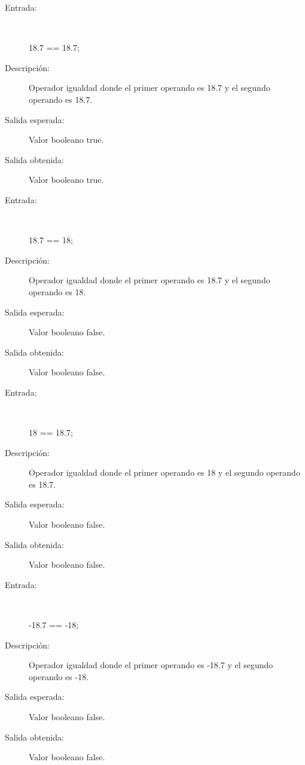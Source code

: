 	\begin{description}
		\item [Entrada:] \hfill \\
\begin{myverbatim}
 18.7 == 18.7;
\end{myverbatim}
		\item [Descripción:] Operador igualdad donde el primer operando es 18.7 y el segundo operando es  18.7.
		\item [Salida esperada:] Valor booleano true.
		\item [Salida obtenida:] Valor booleano true.
	\end{description}

	\begin{description}
		\item [Entrada:] \hfill \\
\begin{myverbatim}
 18.7 == 18;
\end{myverbatim}
		\item [Descripción:] Operador igualdad donde el primer operando es 18.7 y el segundo operando es  18.
		\item [Salida esperada:] Valor booleano false.
		\item [Salida obtenida:] Valor booleano false.
	\end{description}

	\begin{description}
		\item [Entrada:] \hfill \\
\begin{myverbatim}
 18 == 18.7;
\end{myverbatim}
		\item [Descripción:] Operador igualdad donde el primer operando es 18 y el segundo operando es  18.7.
		\item [Salida esperada:] Valor booleano false.
		\item [Salida obtenida:] Valor booleano false.
	\end{description}

	\begin{description}
		\item [Entrada:] \hfill \\
\begin{myverbatim}
 -18.7 == -18;
\end{myverbatim}
		\item [Descripción:] Operador igualdad donde el primer operando es -18.7 y el segundo operando es  -18.
		\item [Salida esperada:] Valor booleano false.
		\item [Salida obtenida:] Valor booleano false.
	\end{description}

